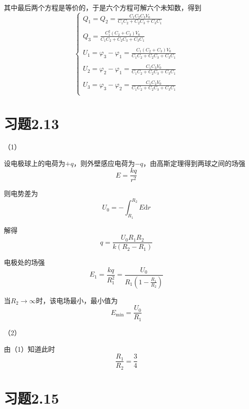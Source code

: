 \documentclass{SCIS2020cn}
\begin{document}
其中最后两个方程是等价的，于是六个方程可解六个未知数，得到
$$\begin{cases}
    \displaystyle{}Q_1=Q_2=\frac{C_1C_2C_3V_0}{C_1C_2+C_2C_3+C_3C_1}\\\\
    \displaystyle{}Q_3=\frac{C_1^2(C_2+C_3)V_0}{C_1C_2+C_2C_3+C_3C_1}\\\\
    \displaystyle{}U_1=\varphi_3-\varphi_1=\frac{C_1(C_2+C_3)V_0}{C_1C_2+C_2C_3+C_3C_1}\\\\
    \displaystyle{}U_2=\varphi_2-\varphi_1=\frac{C_1C_3V_0}{C_1C_2+C_2C_3+C_3C_1}\\\\
    \displaystyle{}U_3=\varphi_3-\varphi_2=\frac{C_1C_2V_0}{C_1C_2+C_2C_3+C_3C_1}\\
\end{cases}$$

\section{习题2.13}
（1）

设电极球上的电荷为$+q$，则外壁感应电荷为$-q$，由高斯定理得到两球之间的场强
\begin{equation}
    E=\frac{kq}{r^2}
\end{equation}

则电势差为
\begin{equation}
    U_0=-\int_{R_1}^{R_2}E\text{d}r
\end{equation}

解得
\begin{equation}
    q=\frac{U_0R_1R_2}{k(R_2-R_1)}
\end{equation}

电极处的场强
\begin{equation}
    E_1=\frac{kq}{R_1^2}=\frac{U_0}{R_1(1-\frac{R_1}{R_2})}
\end{equation}

当$R_2\rightarrow\infty$时，该电场最小，最小值为
\begin{equation}
    E_{\min}=\frac{U_0}{R_1}
\end{equation}

（2）

由（1）知道此时
\begin{equation}
    \frac{R_1}{R_2}=\frac{3}{4}
\end{equation}

\section{习题2.15}
\end{document}
